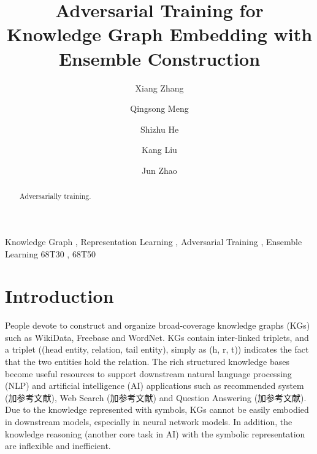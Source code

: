 \documentclass[twocolumn,a4paper,10pt,preprint,3p]{elsarticle}
\begin{document}

\begin{frontmatter}

\title{Adversarial Training for Knowledge Graph Embedding with Ensemble Construction}


\author[hrbaddress]{Xiang Zhang}

\author[hrbaddress]{Qingsong Meng}

\author[ucasaddress]{Shizhu He}

\author[ucasaddress]{Kang Liu}

\author[ucasaddress]{Jun Zhao}

\address[hrbaddress]{Harbin University of Science and Technology, No.52 Xuefu Road, Nangang District, Harbin, 150080, China}
\address[ucasaddress]{University of Chinese Academy of Sciences, No.19(A) Yuquan Road, Shijingshan District, Beijing, 100049, China}


\begin{abstract}
Adversarially training.
\end{abstract}

\begin{keyword}
Knowledge Graph \sep{} Representation Learning \sep{} Adversarial Training \sep{} Ensemble Learning
\MSC[2010] 68T30 \sep{} 68T50
\end{keyword}

\end{frontmatter}


\linenumbers{}


\section{Introduction}
\label{sec:intro}

People devote to construct and organize broad-coverage knowledge graphs (KGs) such as WikiData, Freebase and WordNet. KGs contain inter-linked triplets, and a triplet ((head entity, relation, tail entity), simply as (h, r, t)) indicates the fact that the two entities hold the relation. The rich structured knowledge bases become useful resources to support downstream natural language processing (NLP) and artificial intelligence (AI) applications such as recommended system (加参考文献), Web Search (加参考文献) and Question Answering (加参考文献). Due to the knowledge represented with symbols, KGs cannot be easily embodied in downstream models, especially in neural network models. In addition, the knowledge reasoning (another core task in AI) with the symbolic representation are inflexible and inefficient.
\end{document}
